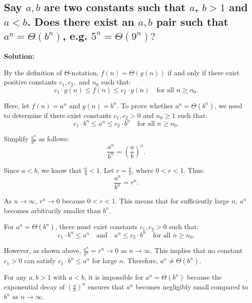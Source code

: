 \documentclass{article}
\begin{document}
\subsection*{Say \( a , b \) are two constants such that \( a \), \( b  > 1\) and \(a < b \). Does there exist an \( a , b \) pair such that \( a^n = \Theta(b^n)\), e.g. \( 5^n = \Theta(9^n)?\) }

\textbf{Solution:}  

By the definition of \( \Theta \)-notation, \( f(n) = \Theta(g(n)) \) if and only if there exist positive constants \( c_1, c_2, \) and \( n_0 \) such that:
\[
c_1 \cdot g(n) \leq f(n) \leq c_2 \cdot g(n) \quad \text{for all } n \geq n_0.
\]

Here, let \( f(n) = a^n \) and \( g(n) = b^n \). To prove whether \( a^n = \Theta(b^n) \), we need to determine if there exist constants \( c_1, c_2 > 0 \) and \( n_0 \geq 1 \) such that:
\[
c_1 \cdot b^n \leq a^n \leq c_2 \cdot b^n \quad \text{for all } n \geq n_0.
\]

Simplify \( \frac{a^n}{b^n} \) as follows:
\[
\frac{a^n}{b^n} = \left( \frac{a}{b} \right)^n.
\]

Since \( a < b \), we know that \( \frac{a}{b} < 1 \). Let \( r = \frac{a}{b} \), where \( 0 < r < 1 \). Thus:
\[
\frac{a^n}{b^n} = r^n.
\]

As \( n \to \infty \), \( r^n \to 0 \) because \( 0 < r < 1 \). This means that for sufficiently large \( n \), \( a^n \) becomes arbitrarily smaller than \( b^n \). 

For \( a^n = \Theta(b^n) \), there must exist constants \( c_1, c_2 > 0 \) such that:
\[
c_1 \cdot b^n \leq a^n \quad \text{and} \quad a^n \leq c_2 \cdot b^n \quad \text{for all } n \geq n_0.
\]

However, as shown above, \( \frac{a^n}{b^n} = r^n \to 0 \) as \( n \to \infty \). This implies that no constant \( c_1 > 0 \) can satisfy \( c_1 \cdot b^n \leq a^n \) for large \( n \). Therefore, \( a^n \neq \Theta(b^n) \).

For any \( a, b > 1 \) with \( a < b \), it is impossible for \( a^n = \Theta(b^n) \) because the exponential decay of \( \left( \frac{a}{b} \right)^n \) ensures that \( a^n \) becomes negligibly small compared to \( b^n \) as \( n \to \infty \).  
\end{document}
